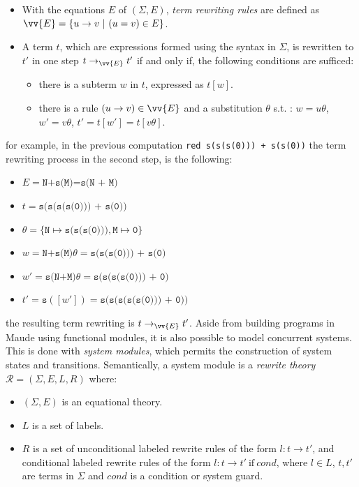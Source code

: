 \begin{itemize}
    \item With the equations $E$ of $(\Sigma, E)$, \textit{term rewriting rules} are defined as $\vv{E} = \{u \rightarrow v  \ | \ (u = v) \in E \}$. 
    \item A term $t$, which are expressions formed using the syntax in $\Sigma$, is rewritten to $t'$ in one step $t \rightarrow_{\vv{E}} t'$ if and only if, the following conditions are sufficed:
        \begin{itemize}
            \item there is a subterm $w$ in $t$, expressed as $t[w]$.
            \item there is a rule $(u \rightarrow v) \in \vv{E}$ and a substitution $\theta$ s.t. : $w = u\theta$, $w' = v\theta$, $t'=t[w']=t[v\theta]$.   
        \end{itemize}
\end{itemize}
for example, in the previous computation \texttt{red s(s(s(0))) + s(s(0))} the term rewriting process in the second step, is the following:
\begin{itemize}
    \item $E = \texttt{N+s(M)=s(N + M)}$
    \item $t = \texttt{s(s(s(s(0))) + s(0))}$
    \item $\theta = \{\texttt{N} \mapsto \texttt{s(s(s(0)))},\texttt{M} \mapsto \texttt{0} \}$
    \item $w = \texttt{N+s(M)}\theta = \texttt{s(s(s(0))) + s(0)}$
    \item $w' = \texttt{s(N+M)}\theta = \texttt{s(s(s(s(0))) + 0)}$
    \item $t' = \texttt{s}([w']) = \texttt{s(s(s(s(s(0))) + 0))}$
\end{itemize}
the resulting term rewriting is $t \rightarrow_{\vv{E}} t'$.
Aside from building programs in Maude using functional modules, it is also possible to model concurrent systems. This is done with \textit{system modules}, which permits the construction of system states and transitions. Semantically, a system module is a \textit{rewrite theory} \cite{PeterMaude,Lecture3} $\mathscr{R} = (\Sigma, E, L, R)$ where: 
\begin{itemize}
    \item $(\Sigma, E)$ is an equational theory.
    \item $L$ is a set of labels.
    \item $R$ is a set of unconditional labeled rewrite rules of the form $l: t \rightarrow t'$, and conditional labeled rewrite rules of the form $l: t \rightarrow t' \ \text{if} \ cond$, where $l \in L$, $t,t'$ are terms in $\Sigma$ and $cond$ is a condition or system guard.    
\end{itemize}
